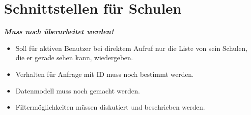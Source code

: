 \section{Schnittstellen für Schulen}
\textbf{\emph{\textcolor[rgb]{1,0,0}{Muss noch überarbeitet werden!}}}
\begin{itemize}
	\item Soll für aktiven Benutzer bei direktem Aufruf nur die Liste von sein Schulen, die er gerade sehen kann, wiedergeben.
	\item Verhalten für Anfrage mit ID muss noch bestimmt werden.
	\item Datenmodell muss noch gemacht werden.
	\item Filtermöglichkeiten müssen diskutiert und beschrieben werden.
\end{itemize}

%










